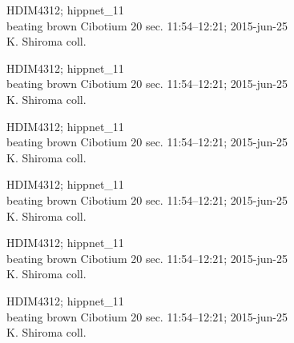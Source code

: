 \documentclass[2pt]{extarticle}
\begin{document}
\noindent
\parbox{0.16\textwidth}{\tiny \raggedright \rule[-0.3\baselineskip]{0pt}{10pt}HDIM4312; hippnet\_11\\ beating brown Cibotium 20 sec. 11:54--12:21; 2015-jun-25\\ K. Shiroma coll.}
\parbox{0.16\textwidth}{\tiny \raggedright \rule[-0.3\baselineskip]{0pt}{10pt}HDIM4312; hippnet\_11\\ beating brown Cibotium 20 sec. 11:54--12:21; 2015-jun-25\\ K. Shiroma coll.}
\parbox{0.16\textwidth}{\tiny \raggedright \rule[-0.3\baselineskip]{0pt}{10pt}HDIM4312; hippnet\_11\\ beating brown Cibotium 20 sec. 11:54--12:21; 2015-jun-25\\ K. Shiroma coll.}
\parbox{0.16\textwidth}{\tiny \raggedright \rule[-0.3\baselineskip]{0pt}{10pt}HDIM4312; hippnet\_11\\ beating brown Cibotium 20 sec. 11:54--12:21; 2015-jun-25\\ K. Shiroma coll.}
\parbox{0.16\textwidth}{\tiny \raggedright \rule[-0.3\baselineskip]{0pt}{10pt}HDIM4312; hippnet\_11\\ beating brown Cibotium 20 sec. 11:54--12:21; 2015-jun-25\\ K. Shiroma coll.}
\parbox{0.16\textwidth}{\tiny \raggedright \rule[-0.3\baselineskip]{0pt}{10pt}HDIM4312; hippnet\_11\\ beating brown Cibotium 20 sec. 11:54--12:21; 2015-jun-25\\ K. Shiroma coll.} \\ 
\vspace{0.001in} 
\end{document}

